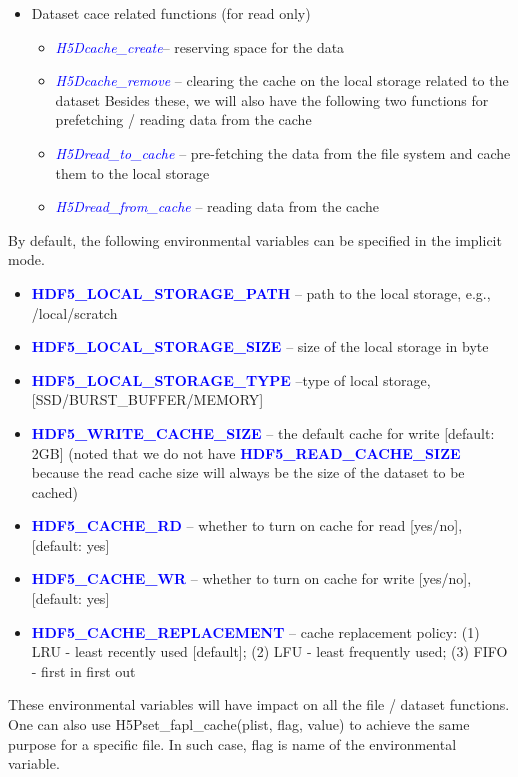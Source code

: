 \documentclass[aps, prb, 11pt, notitlepage]{revtex4-1}
\def\keywords#1{\textcolor{blue}{{\bf #1}}}
\def\function#1{\textcolor{blue}{{\it #1}}}
\begin{document}
\begin{itemize}
\begin{itemize}
\end{itemize}
\item Dataset cace related functions (for read only)
\begin{itemize}
\item \function{H5Dcache\_create}-- reserving space for the data
\item \function{H5Dcache\_remove} -- clearing the cache on the local storage related to the dataset Besides these, we will also have the following two functions for prefetching / reading data from the cache
\item \function{H5Dread\_to\_cache} -- pre-fetching the data from the file system and cache them to the local storage
\item \function{H5Dread\_from\_cache} -- reading data from the cache
\end{itemize}
\end{itemize}

By default, the following environmental variables can be specified in the implicit mode. 
\begin{itemize}
\item \keywords{HDF5\_LOCAL\_STORAGE\_PATH} -- path to the local storage, e.g., /local/scratch
\item \keywords{HDF5\_LOCAL\_STORAGE\_SIZE} -- size of the local storage in byte
\item \keywords{HDF5\_LOCAL\_STORAGE\_TYPE} --type of local storage, [SSD/BURST\_BUFFER/MEMORY]
\item \keywords{HDF5\_WRITE\_CACHE\_SIZE} -- the default cache for write [default: 2GB] (noted that we do not have \keywords{HDF5\_READ\_CACHE\_SIZE} because the read cache size will always be the size of the dataset to be cached)
\item \keywords{HDF5\_CACHE\_RD} -- whether to turn on cache for read [yes/no], [default: yes]
\item \keywords{HDF5\_CACHE\_WR} -- whether to turn on cache for write [yes/no], [default: yes]
\item \keywords{HDF5\_CACHE\_REPLACEMENT} -- cache replacement policy: (1) LRU - least recently used [default]; (2) LFU - least frequently used; (3) FIFO - first in first out
\end{itemize}
These environmental variables will have impact on all the file / dataset functions. One can also use H5Pset\_fapl\_cache(plist, flag, value) to achieve the same purpose for a specific file. In such case, flag is name of the environmental variable. 
\end{document}
